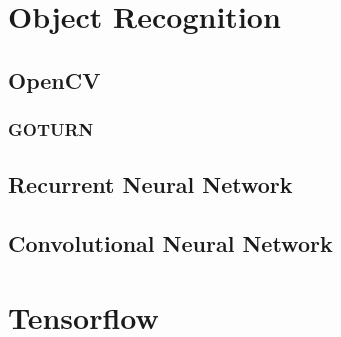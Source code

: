\section{Object Recognition}

\subsection{OpenCV}

\subsubsection{GOTURN}


\subsection{Recurrent Neural Network}

\subsection{Convolutional Neural Network}

\section{Tensorflow}


